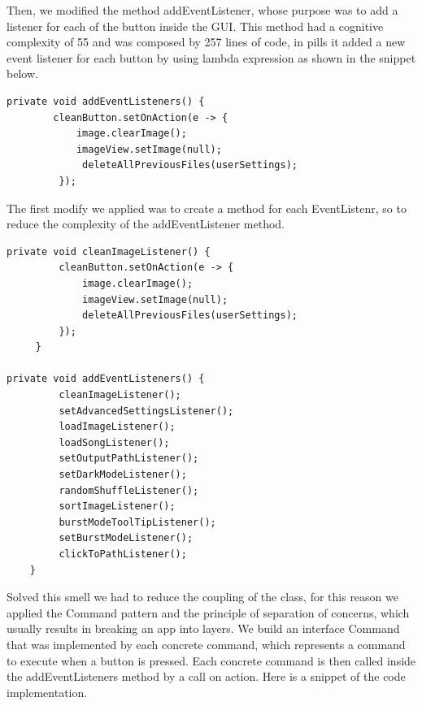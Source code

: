 \documentclass{article}
\begin{document}
Then, we modified the method addEventListener, whose  purpose was to add a listener for each of the button inside the GUI. This method had a cognitive complexity of 55 and was composed by 257 lines of code, in pills it added a new event listener for each button by using lambda expression as shown in the snippet below.

\begin{lstlisting}[caption={Old Implementation},captionpos =b]
private void addEventListeners() {
        cleanButton.setOnAction(e -> {
            image.clearImage();
            imageView.setImage(null);
             deleteAllPreviousFiles(userSettings);
         });
\end{lstlisting}

The first modify we applied was to create a method for each EventListenr, so to reduce the complexity of the addEventListener method.

\begin{lstlisting}[caption={First modifies},captionpos =b]
private void cleanImageListener() {
         cleanButton.setOnAction(e -> {
             image.clearImage();
             imageView.setImage(null);
             deleteAllPreviousFiles(userSettings);
         });
     }
     
private void addEventListeners() {
         cleanImageListener();
         setAdvancedSettingsListener();
         loadImageListener();
         loadSongListener();
         setOutputPathListener();
         setDarkModeListener();
         randomShuffleListener();
         sortImageListener();
         burstModeToolTipListener();
         setBurstModeListener();
         clickToPathListener();
    }
\end{lstlisting}
Solved this smell we had to reduce the coupling of the class, for this reason we applied the Command pattern and the principle of separation of concerns, which usually results in breaking an app into layers.
We build an interface Command that was implemented by each concrete command, which represents a command to execute when a button is pressed.
Each concrete command is then called inside the addEventListeners method by a call on action.
Here is a snippet of the code implementation.

\end{document}
